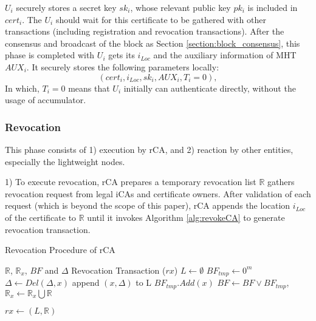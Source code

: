 \documentclass[conference]{IEEEtran}
\begin{document}
$U_i$ securely stores a secret key $sk_i$, whose relevant public key $pk_i$ is included in $cert_i$. The $U_i$ should wait for this certificate to be gathered with other transactions (including registration and revocation transactions). After the consensus and broadcast of the block as Section \ref{section:block_consensus}, this phase is completed with $U_i$ gets its $i_{Loc}$ and the auxiliary information of MHT $AUX_i$. It securely stores the following parameters locally:
$$(cert_i, i_{Loc}, sk_i, AUX_i, T_i = 0),$$
In which, $T_i = 0$ means that $U_i$ initially can authenticate directly, without the usage of accumulator.


\subsubsection{Revocation} \label{sec:revoke}
This phase consists of 1) execution by rCA, and 2) reaction by other entities, especially the lightweight nodes. 

1) To execute revocation, rCA prepares a temporary revocation list $\mathbb{R}$ gathers revocation request from legal iCAs and certificate owners. After validation of each request (which is beyond the scope of this paper), rCA appends the location $i_{Loc}$ of the certificate to $\mathbb{R}$ until it invokes Algorithm \ref{alg:revokeCA} to generate revocation transaction. 



\begin{algorithm}[t]
\renewcommand{\algorithmicensure}{\textbf{Output:}}
	\caption{Revocation Procedure of rCA}\label{alg:revokeCA}
	\begin{algorithmic}[1]
		\Require $\mathbb{R}$, $\mathbb{R}_x$, $BF$ and $\Delta$ %
		\Ensure Revocation Transaction ($rx$)
		\State $L\gets \emptyset$
		\State $BF_{tmp} \gets 0^m$ 
		\State $\Delta \gets Del(\Delta, x)$ 
		\State append $(x, \Delta)$ to L
		\Else
		\State $BF_{tmp}.Add(x)$ %
		\EndIf
		\EndFor
		\State $BF \gets BF \lor BF_{tmp}$, $\mathbb{R}_x \gets \mathbb{R}_x \bigcup \mathbb{R} $
		
		\Return $rx \gets (L, \mathbb{R})$
	\end{algorithmic}
\end{algorithm}
\end{document}
